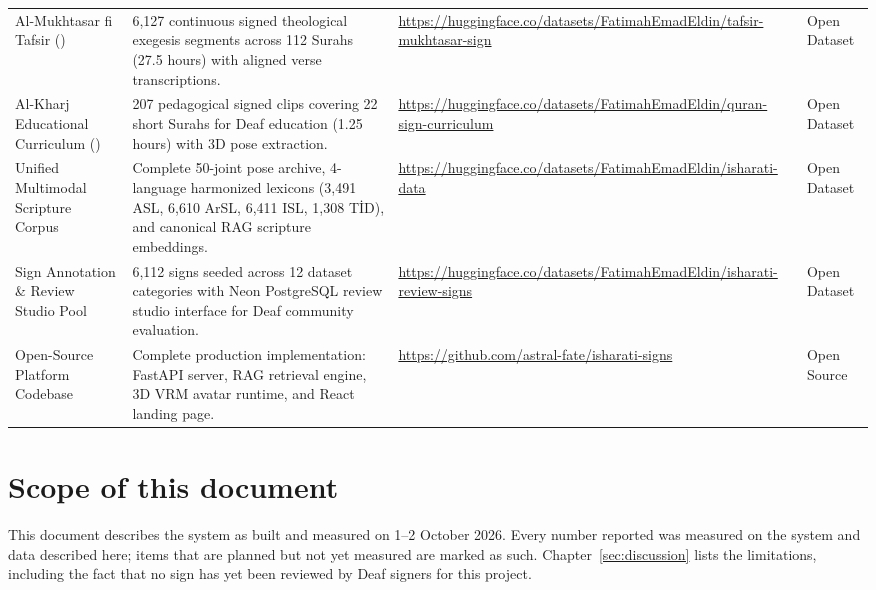 \begin{table}[!ht]
\begin{tabularx}{\textwidth}{L{2.8cm} Y L{4.6cm} L{1.8cm}}
\addlinespace[3pt]
Al-Mukhtasar fi Tafsir () & 6,127 continuous signed theological exegesis segments across 112 Surahs (27.5 hours) with aligned verse transcriptions. & \url{https://huggingface.co/datasets/FatimahEmadEldin/tafsir-mukhtasar-sign} & Open Dataset \\
\addlinespace[3pt]
Al-Kharj Educational Curriculum () & 207 pedagogical signed clips covering 22 short Surahs for Deaf education (1.25 hours) with 3D pose extraction. & \url{https://huggingface.co/datasets/FatimahEmadEldin/quran-sign-curriculum} & Open Dataset \\
\addlinespace[3pt]
Unified Multimodal Scripture Corpus & Complete 50-joint pose archive, 4-language harmonized lexicons (3,491 ASL, 6,610 ArSL, 6,411 ISL, 1,308 T\.{I}D), and canonical RAG scripture embeddings. & \url{https://huggingface.co/datasets/FatimahEmadEldin/isharati-data} & Open Dataset \\
\addlinespace[3pt]
Sign Annotation \& Review Studio Pool & 6,112 signs seeded across 12 dataset categories with Neon PostgreSQL review studio interface for Deaf community evaluation. & \url{https://huggingface.co/datasets/FatimahEmadEldin/isharati-review-signs} & Open Dataset \\
\addlinespace[3pt]
Open-Source Platform Codebase & Complete production implementation: FastAPI server, RAG retrieval engine, 3D VRM avatar runtime, and React landing page. & \url{https://github.com/astral-fate/isharati-signs} & Open Source \\
\bottomrule
\end{tabularx}
\end{table}

\section{Scope of this document}
This document describes the system as built and measured on 1--2 October 2026. Every number reported was measured on
the system and data described here; items that are planned but not yet measured are marked as such. Chapter~\ref{sec:discussion} lists the limitations, including the fact that no sign has yet been reviewed
by Deaf signers for this project.
